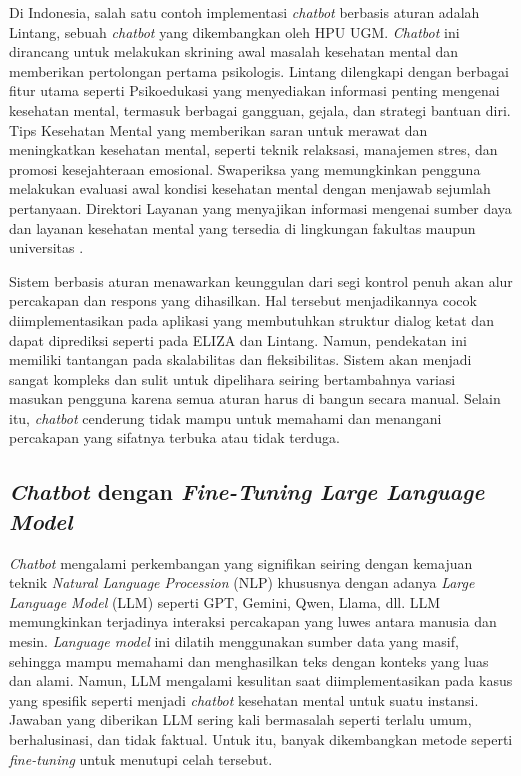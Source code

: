 Di Indonesia, salah satu contoh implementasi \textit{chatbot} berbasis aturan adalah Lintang, sebuah \textit{chatbot} yang dikembangkan oleh HPU UGM.
\textit{Chatbot} ini dirancang untuk melakukan skrining awal masalah kesehatan mental dan memberikan pertolongan pertama psikologis.
Lintang dilengkapi dengan berbagai fitur utama seperti Psikoedukasi yang menyediakan informasi penting mengenai kesehatan mental, termasuk berbagai gangguan, gejala, dan strategi bantuan diri.
Tips Kesehatan Mental yang memberikan saran untuk merawat dan meningkatkan kesehatan mental, seperti teknik relaksasi, manajemen stres, dan promosi kesejahteraan emosional.
Swaperiksa yang memungkinkan pengguna melakukan evaluasi awal kondisi kesehatan mental dengan menjawab sejumlah pertanyaan.
Direktori Layanan yang menyajikan informasi mengenai sumber daya dan layanan kesehatan mental yang tersedia di lingkungan fakultas maupun universitas \cite{Lintang}.

Sistem berbasis aturan menawarkan keunggulan dari segi kontrol penuh akan alur percakapan dan respons yang dihasilkan.
Hal tersebut menjadikannya cocok diimplementasikan pada aplikasi yang membutuhkan struktur dialog ketat dan dapat diprediksi seperti pada ELIZA dan Lintang.
Namun, pendekatan ini memiliki tantangan pada skalabilitas dan fleksibilitas.
Sistem akan menjadi sangat kompleks dan sulit untuk dipelihara seiring bertambahnya variasi masukan pengguna karena semua aturan harus di bangun secara manual.
Selain itu, \textit{chatbot} cenderung tidak mampu untuk memahami dan menangani percakapan yang sifatnya terbuka atau tidak terduga.


\subsection{\textit{Chatbot} dengan \textit{Fine-Tuning Large Language Model}}
\textit{Chatbot} mengalami perkembangan yang signifikan seiring dengan kemajuan teknik \textit{Natural Language Procession} (NLP) khususnya dengan adanya \textit{Large Language Model} (LLM) seperti GPT, Gemini, Qwen, Llama, dll.
LLM memungkinkan terjadinya interaksi percakapan yang luwes antara manusia dan mesin.
\textit{Language model} ini dilatih menggunakan sumber data yang masif, sehingga mampu memahami dan menghasilkan teks dengan konteks yang luas dan alami.
Namun, LLM mengalami kesulitan saat diimplementasikan pada kasus yang spesifik seperti menjadi \textit{chatbot} kesehatan mental untuk suatu instansi.
Jawaban yang diberikan LLM sering kali bermasalah seperti terlalu umum, berhalusinasi, dan tidak faktual.
Untuk itu, banyak dikembangkan metode seperti \textit{fine-tuning} untuk menutupi celah tersebut.

